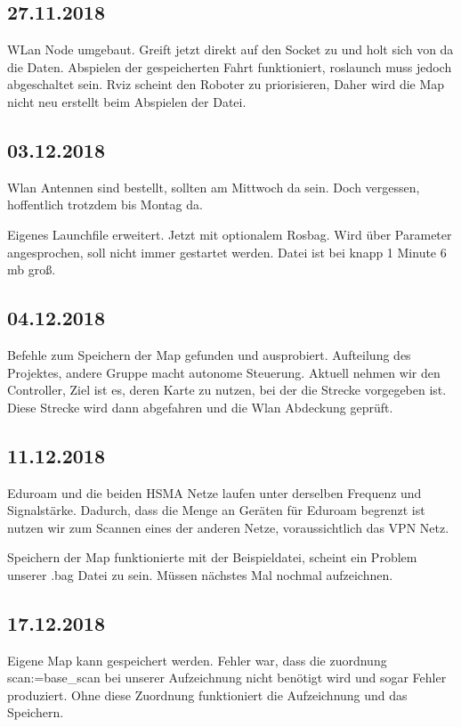 \documentclass{scrartcl}%
\begin{document}
\subsection{27.11.2018}
WLan Node umgebaut. Greift jetzt direkt auf den Socket zu und holt sich von da die Daten. Abspielen der gespeicherten Fahrt funktioniert, roslaunch muss jedoch abgeschaltet sein. Rviz scheint den Roboter zu priorisieren, Daher wird die Map nicht neu erstellt beim Abspielen der Datei.

\subsection{03.12.2018}
Wlan Antennen sind bestellt, sollten am Mittwoch da sein. Doch vergessen, hoffentlich trotzdem bis Montag da.

Eigenes Launchfile erweitert. Jetzt mit optionalem Rosbag. Wird über Parameter angesprochen, soll nicht immer gestartet werden. Datei ist bei knapp 1 Minute 6 mb groß.

\subsection{04.12.2018}
Befehle zum Speichern der Map gefunden und ausprobiert. Aufteilung des Projektes, andere Gruppe macht autonome Steuerung. Aktuell nehmen wir den Controller, Ziel ist es, deren Karte zu nutzen, bei der die Strecke vorgegeben ist. Diese Strecke wird dann abgefahren und die Wlan Abdeckung geprüft.

\subsection{11.12.2018}
Eduroam und die beiden HSMA Netze laufen unter derselben Frequenz und Signalstärke. Dadurch, dass die Menge an Geräten für Eduroam begrenzt ist nutzen wir zum Scannen eines der anderen Netze, voraussichtlich das VPN Netz.

Speichern der Map funktionierte mit der Beispieldatei, scheint ein Problem unserer .bag Datei zu sein. Müssen nächstes Mal nochmal aufzeichnen.

\subsection{17.12.2018}
Eigene Map kann gespeichert werden. Fehler war, dass die zuordnung scan:=base\_scan bei unserer Aufzeichnung nicht benötigt wird und sogar Fehler produziert. Ohne diese Zuordnung funktioniert die Aufzeichnung und das Speichern.
\end{document}
